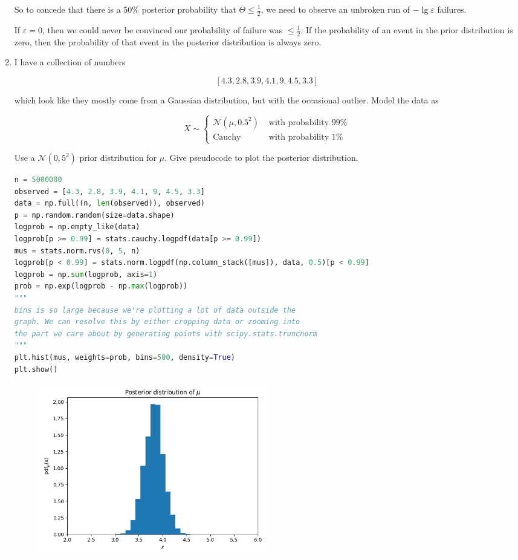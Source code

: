 \documentclass[10pt,\jkfside,a4paper]{article}
\begin{document}
\begin{enumerate}
So to concede that there is a 50\% posterior probability that $\Theta \leq
\frac{1}{2}$, we need to observe an unbroken run of $-\lg \varepsilon$
failures.

If $\varepsilon = 0$, then we could never be convinced our probability of
failure was $\leq \frac{1}{2}$. If the probability of an event in the prior
distribution is zero, then the probability of that event in the posterior
distribution is always zero.

\item I have a collection of numbers

\[
[4.3, 2.8, 3.9, 4.1, 9, 4.5, 3.3]
\]

which look like they mostly come from a Gaussian distribution, but with the
occasional outlier. Model the data as

\[
X \sim
\begin{cases}
\mathcal{N}\left(\mu, 0.5^2\right) & \text{ with probability } 99\% \\
\text{Cauchy} & \text{ with probability } 1\%
\end{cases}
\]

Use a $\mathcal{N}(0, 5^2)$ prior distribution for $\mu$. Give pseudocode to
plot the posterior distribution.

\begin{lstlisting}[language=Python]
n = 5000000
observed = [4.3, 2.8, 3.9, 4.1, 9, 4.5, 3.3]
data = np.full((n, len(observed)), observed)
p = np.random.random(size=data.shape)
logprob = np.empty_like(data)
logprob[p >= 0.99] = stats.cauchy.logpdf(data[p >= 0.99])
mus = stats.norm.rvs(0, 5, n)
logprob[p < 0.99] = stats.norm.logpdf(np.column_stack([mus]), data, 0.5)[p < 0.99]
logprob = np.sum(logprob, axis=1)
prob = np.exp(logprob - np.max(logprob))
"""
bins is so large because we're plotting a lot of data outside the
graph. We can resolve this by either cropping data or zooming into
the part we care about by generating points with scipy.stats.truncnorm
"""
plt.hist(mus, weights=prob, bins=500, density=True)
plt.show()
\end{lstlisting}

\begin{figure}[H]
\centering
\includegraphics[width=0.5\textwidth]{./posterior_distribution_mu_cauchy_and_normal}
\end{figure}


\end{enumerate}
\end{document}
